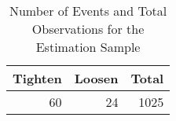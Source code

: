 \begin{table}[ht]
\centering
\caption{Number of Events and Total Observations for the Estimation Sample} 
\begin{tabular}{rrr}
  \hline
Tighten & Loosen & Total \\ 
  \hline
 60 &  24 & 1025 \\ 
   \hline
\end{tabular}
\end{table}
